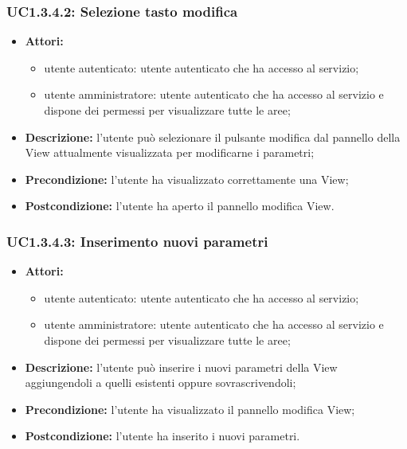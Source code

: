 \subsubsection{UC1.3.4.2: Selezione tasto modifica}

\begin{itemize}
   	\item \textbf{Attori:}
    \begin{itemize}
    	\item utente autenticato: utente autenticato che ha accesso al servizio;
    	\item utente amministratore: utente autenticato che ha accesso al servizio e dispone dei permessi per visualizzare tutte le aree;
	\end{itemize}
    \item \textbf{Descrizione:} l'utente può selezionare il pulsante modifica dal pannello della View attualmente visualizzata per modificarne i parametri;
    \item \textbf{Precondizione:} l'utente ha visualizzato correttamente una View;
    \item \textbf{Postcondizione:} l'utente ha aperto il pannello modifica View.
\end{itemize}

\subsubsection{UC1.3.4.3: Inserimento nuovi parametri}

\begin{itemize}
    \item \textbf{Attori:}
    \begin{itemize}
    	\item utente autenticato: utente autenticato che ha accesso al servizio;
    	\item utente amministratore: utente autenticato che ha accesso al servizio e dispone dei permessi per visualizzare tutte le aree;
	\end{itemize}
    \item \textbf{Descrizione:} l'utente può inserire i nuovi parametri della View aggiungendoli a quelli esistenti oppure sovrascrivendoli;
    \item \textbf{Precondizione:} l'utente ha visualizzato il pannello modifica View;
    \item \textbf{Postcondizione:} l'utente ha inserito i nuovi parametri.
\end{itemize}

